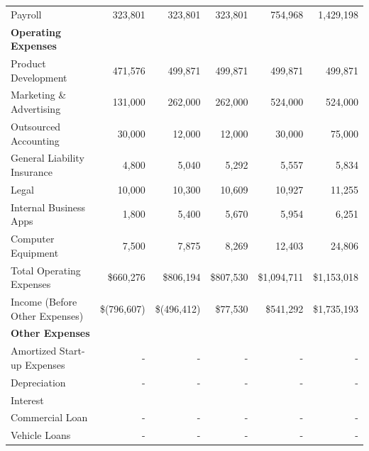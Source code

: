 \documentclass[10pt,openany]{book}
\begin{document}
\begin{landscape}
\begin{center}
\begin{longtable}[]{@{}lrrrrr@{}}
      \hspace{3mm} Payroll & 323,801 & 323,801 & 323,801 & 754,968 & 1,429,198 \\
      \textbf{Operating Expenses} & & & & & \\
      \midrule
      \hspace{3mm} Product Development & 471,576 & 499,871 & 499,871 & 499,871 & 499,871 \\
      \hspace{3mm} Marketing \& Advertising & 131,000 & 262,000 & 262,000 & 524,000 & 524,000 \\
      \hspace{3mm} Outsourced Accounting & 30,000 & 12,000 & 12,000 & 30,000 & 75,000 \\
      \hspace{3mm} General Liability Insurance & 4,800 & 5,040 & 5,292 & 5,557 & 5,834 \\
      \hspace{3mm} Legal & 10,000 & 10,300 & 10,609 & 10,927 & 11,255 \\
      \hspace{3mm} Internal Business Apps & 1,800 & 5,400 & 5,670 & 5,954 & 6,251 \\
      \hspace{3mm} Computer Equipment & 7,500 & 7,875 & 8,269 & 12,403 & 24,806 \\
      \hspace{3mm} Total Operating Expenses & \$660,276 & \$806,194 & \$807,530 & \$1,094,711 & \$1,153,018 \\
      \hspace{3mm} Income (Before Other Expenses) & \$(796,607) & \$(496,412) & \$77,530 & \$541,292 & \$1,735,193 \\
      \textbf{Other Expenses} & & & & & \\
      \midrule
      \hspace{3mm} Amortized Start-up Expenses & - & - & - & - & - \\
      \hspace{3mm} Depreciation & - & - & - & - & - \\
      \hspace{3mm} Interest & & & & & \\
      \hspace{3mm} Commercial Loan & - & - & - & - & - \\
      \hspace{3mm} Vehicle Loans & - & - & - & - & - \\

\end{longtable}
\end{center}
\end{landscape}
\end{document}
